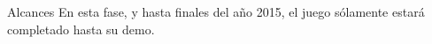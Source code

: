 \begin{section}{Alcances}
  En esta fase, y hasta finales del año 2015, el juego sólamente estará completado hasta su demo.

  

\end{section}
